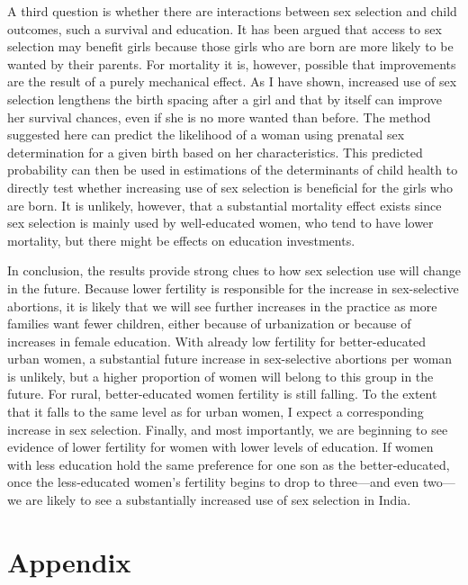 \documentclass[12pt,letterpaper]{article}
\begin{document}
A third question is whether there are interactions between sex selection and child outcomes,
such a survival and education.
It has been argued that access to sex selection may benefit girls because those girls
who are born are more likely to be wanted by their parents.
For mortality it is, however, possible that improvements are the result of a purely 
mechanical effect.
As I have shown, increased use of sex selection lengthens the birth spacing after a girl 
and that by itself can improve her survival chances, even if she is no more wanted than before.
The method suggested here can predict the likelihood of a woman using prenatal sex 
determination for a given birth based on her characteristics.
This predicted probability can then be used in estimations of the determinants
of child health to directly test whether increasing use of sex selection is 
beneficial for the girls who are born.
It is unlikely, however, that a substantial mortality effect exists since sex 
selection is mainly used by well-educated women, who tend to have lower mortality, 
but there might be effects on education investments.

In conclusion, the results provide strong clues to how sex selection use will change in the future.
Because lower fertility is responsible for the increase in sex-selective abortions, 
it is likely that we will see further increases in the practice as more families 
want fewer children, either because of urbanization or because of increases in female 
education.
With already low fertility for better-educated urban women, a substantial future increase 
in sex-selective abortions per woman is unlikely, 
but a higher proportion of women will belong to this group in the future.
For rural, better-educated women fertility is still falling.
To the extent that it falls to the same level as for urban
women, I expect a corresponding increase in sex selection.
Finally, and most importantly, we are beginning to see evidence of lower fertility 
for women with lower levels of education.
If women with less education hold the same preference for one son as the better-educated,
once the less-educated women's fertility begins to drop to three---and even two---we are 
likely to see a substantially increased use of sex selection in India.






\newpage
\onehalfspacing






\clearpage
\newpage

\appendix
\section{Appendix}

\renewcommand\thefigure{\thesection.\arabic{figure}}    
\setcounter{figure}{0}
\renewcommand\thetable{\thesection.\arabic{table}}    
\setcounter{table}{0}
  

\end{document}

